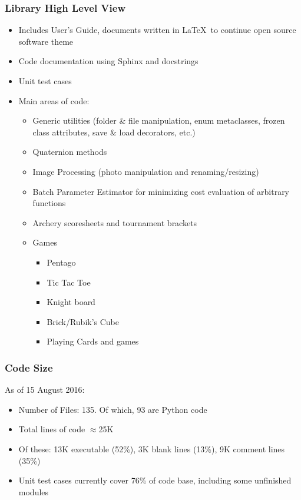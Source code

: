 \documentclass{beamer}
\begin{document}
\begin{frame}
	\frametitle{Library High Level View}
    \begin{itemize}
        \item Includes User's Guide, documents written in \LaTeX\  to continue open source software theme
        \item Code documentation using Sphinx and docstrings
        \item Unit test cases
        \item Main areas of code:
        \begin{itemize}
            \item Generic utilities (folder \& file manipulation, enum metaclasses, frozen class attributes, save \& load decorators, etc.)
            \item Quaternion methods
            \item Image Processing (photo manipulation and renaming/resizing)
            \item Batch Parameter Estimator for minimizing cost evaluation of arbitrary functions
            \item Archery scoresheets and tournament brackets
            \item Games
            \begin{itemize}
                \item Pentago
                \item Tic Tac Toe
                \item Knight board
                \item Brick/Rubik's Cube
                \item Playing Cards and games
            \end{itemize}
        \end{itemize}
    \end{itemize}
\end{frame}

\begin{frame}
	\frametitle{Code Size}
    As of 15 August 2016:
    \begin{itemize}
        \item Number of Files: 135.  Of which, 93 are Python code
        \item Total lines of code $\approx$25K
        \item Of these: 13K executable (52\%), 3K blank lines (13\%), 9K comment lines (35\%)
        \item Unit test cases currently cover 76\% of code base, including some unfinished modules
    \end{itemize}
\end{frame}
\end{document}
